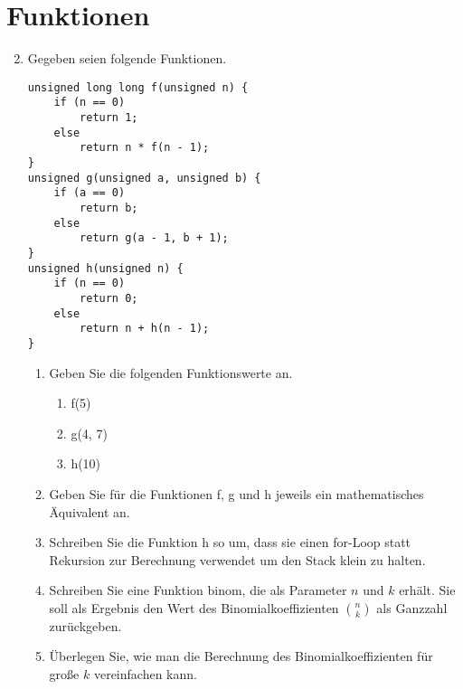 \documentclass[ngerman]{tudscrreprt}
\begin{document}
\section*{Funktionen}
\begin{enumerate}
\setcounter{enumi}{1}
\item Gegeben seien folgende Funktionen.
\begin{lstlisting}[frame=single]
unsigned long long f(unsigned n) {
    if (n == 0)
        return 1;
    else
        return n * f(n - 1);
}
unsigned g(unsigned a, unsigned b) {
    if (a == 0)
        return b;
    else
        return g(a - 1, b + 1);
}
unsigned h(unsigned n) {
    if (n == 0)
        return 0;
    else
        return n + h(n - 1);
}
\end{lstlisting}
\begin{enumerate}
\item Geben Sie die folgenden Funktionswerte an.
  \begin{enumerate}[label=\roman*)]
    \item f(5)
    \item g(4, 7)
    \item h(10)
  \end{enumerate}
\item Geben Sie für die Funktionen f, g und h jeweils ein mathematisches Äquivalent an.
\item Schreiben Sie die Funktion h so um, dass sie einen for-Loop statt Rekursion zur Berechnung verwendet um den Stack klein zu halten.
\item Schreiben Sie eine Funktion binom, die als Parameter $n$ und $k$ erhält. Sie soll als Ergebnis den Wert des Binomialkoeffizienten $\binom{n}{k}$ als Ganzzahl zurückgeben.
\item Überlegen Sie, wie man die Berechnung des Binomialkoeffizienten für große $k$ vereinfachen kann.
\end{enumerate}
\end{enumerate}
\end{document}
